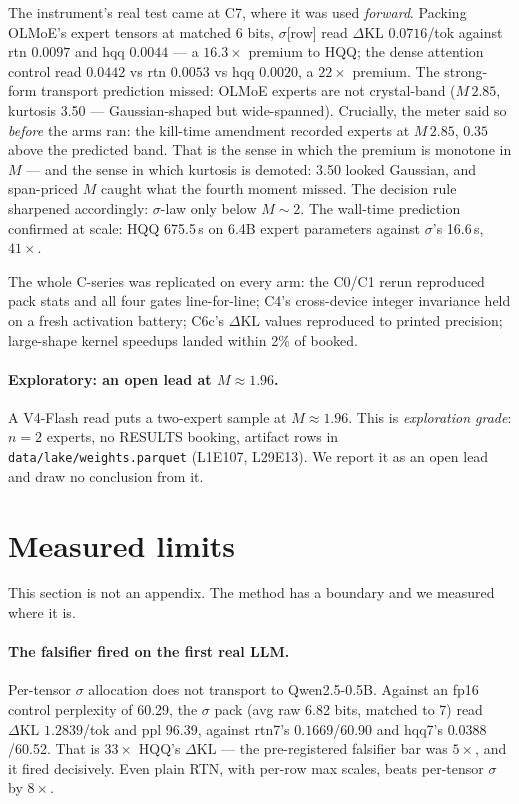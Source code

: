 \documentclass[11pt]{article}
\newcommand{\dkl}{\ensuremath{\Delta\mathrm{KL}}}
\begin{document}
The instrument's real test came at C7, where it was used \emph{forward}. Packing
OLMoE's expert tensors at matched 6 bits, $\sigma$[row] read \dkl{} $0.0716$/tok
against rtn $0.0097$ and hqq $0.0044$ --- a $16.3\times$ premium to HQQ; the
dense attention control read $0.0442$ vs rtn $0.0053$ vs hqq $0.0020$, a
$22\times$ premium. %
The strong-form transport prediction missed: OLMoE experts are not crystal-band
($M\,2.85$, kurtosis 3.50 --- Gaussian-shaped but wide-spanned).
Crucially, the meter said so \emph{before} the arms ran: the kill-time amendment
recorded experts at $M\,2.85$, $0.35$ above the predicted band.
That is the sense in which the premium is monotone in $M$ --- and the sense in
which kurtosis is demoted: 3.50 looked Gaussian, and span-priced $M$ caught what
the fourth moment missed. %
The decision rule sharpened accordingly: $\sigma$-law only below $M \sim 2$.
The wall-time prediction confirmed at scale: HQQ 675.5\,s on 6.4B expert
parameters against $\sigma$'s 16.6\,s, $41\times$. %

The whole C-series was replicated on every arm: the C0/C1 rerun reproduced pack
stats and all four gates line-for-line; C4's cross-device integer invariance held
on a fresh activation battery; C6c's \dkl{} values reproduced to printed
precision; large-shape kernel speedups landed within 2\% of booked.

\paragraph{Exploratory: an open lead at $M \approx 1.96$.}
A V4-Flash read puts a two-expert sample at $M \approx 1.96$. This is
\emph{exploration grade}: $n{=}2$ experts, no RESULTS booking, artifact rows in
\texttt{data/lake/weights.parquet} (L1E107, L29E13). We report it as an open lead
and draw no conclusion from it.

\section{Measured limits}
\label{sec:limits}

This section is not an appendix. The method has a boundary and we measured where
it is.

\paragraph{The falsifier fired on the first real LLM.}
Per-tensor $\sigma$ allocation does not transport to Qwen2.5-0.5B. Against an
fp16 control perplexity of 60.29, the $\sigma$ pack (avg raw 6.82 bits, matched
to 7) read \dkl{} $1.2839$/tok and ppl 96.39, against rtn7's $0.1669$/60.90 and
hqq7's $0.0388$/60.52. That is $33\times$ HQQ's \dkl{} --- the pre-registered
falsifier bar was $5\times$, and it fired decisively. Even plain RTN, with
per-row max scales, beats per-tensor $\sigma$ by $8\times$. %
\end{document}
